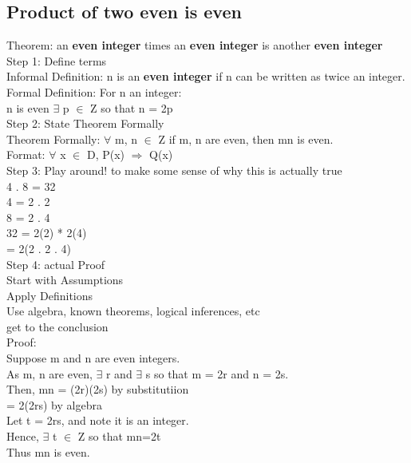 \documentclass[11pt]{article}
\begin{document}
\subsection{Product of two even is even}
\label{sec:orgcaa1ef3}
Theorem: an \textbf{even integer} times an \textbf{even integer} is another \textbf{even integer}\\

Step 1: Define terms\\
Informal Definition: n is an \textbf{even integer} if n can be written as twice an integer.\\
Formal Definition: For n an integer:\\
n is even \iff \(\exists\) p \(\in\) Z so that n = 2p\\

Step 2: State Theorem Formally\\
Theorem Formally: \(\forall\) m, n \(\in\) Z if m, n are even, then mn is even.\\

Format: \(\forall\) x \(\in\) D, P(x) \(\Rightarrow\) Q(x)\\

Step 3: Play around! to make some sense of why this is actually true\\
4 . 8 = 32\\
4 =  2 . 2\\
8 = 2 . 4\\
32 = 2(2) * 2(4)\\
= 2(2 . 2 . 4)\\

Step 4: actual Proof\\

Start with Assumptions\\

Apply Definitions\\

Use algebra, known theorems, logical inferences, etc\\

get to the conclusion\\

Proof:\\
Suppose m and n are even integers.\\
As m, n are even, \(\exists\) r and \(\exists\) s so that m = 2r and n = 2s.\\
Then, mn = (2r)(2s) by substitutiion\\
= 2(2rs) by algebra\\
Let t = 2rs, and note it is an integer.\\
Hence, \(\exists\) t \(\in\) Z so that mn=2t\\
Thus mn is even.\\
\end{document}
